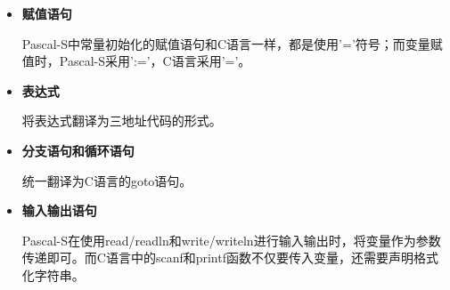 \documentclass[../main.tex]{subfiles}
\begin{document}
\begin{itemize}
    \item \textbf{赋值语句}
    
    Pascal-S中常量初始化的赋值语句和C语言一样，都是使用'='符号；而变量赋值时，Pascal-S采用':='，C语言采用'='。

    \item \textbf{表达式}
    
    将表达式翻译为三地址代码的形式。
    
    \item \textbf{分支语句和循环语句}
    
    统一翻译为C语言的goto语句。

    \item \textbf{输入输出语句}
    
    Pascal-S在使用read/readln和write/writeln进行输入输出时，将变量作为参数传递即可。而C语言中的scanf和printf函数不仅要传入变量，还需要声明格式化字符串。
    
\end{itemize}
\end{document}
